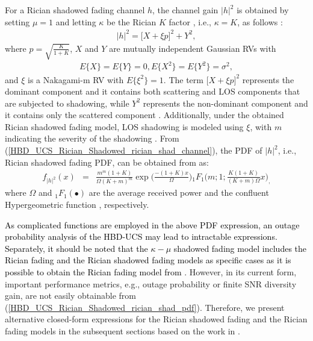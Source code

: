 For a Rician shadowed fading channel $h$, the channel gain $|h|^2$ is obtained by setting $\mu=1$ and letting $\kappa$ be the Rician $K$ factor \cite{chun2017comprehensive,paris2014statistical}, i.e., $\kappa = K$, as follows \cite[eq. (8)]{chun2017comprehensive}:
\begin{eqnarray} \label{HBD_UCS_Rician_Shadowed_rician_shad_channel}
|h|^2 = \big[X + {\xi}p\big]^2 + Y^2,
\end{eqnarray}
where $p = \sqrt{\frac{K}{1+K}}$, $X$ and $Y$ are mutually independent Gaussian RVs with
\begin{eqnarray}
E\{X\}=E\{Y\} = 0, E\{X^2\}=E\{Y^2\} = \sigma^2,
\end{eqnarray}
and $\xi$ is a Nakagami-m RV with $E\{\xi^2\}=1$. The term $\big[X + {\xi}p\big]^2$ represents the dominant component and it contains both scattering and LOS components that are subjected to shadowing, while $Y^2$ represents the non-dominant component and it contains only the scattered component \cite{yuan2018capacity}. Additionally, under the obtained Rician shadowed fading model, LOS shadowing is modeled using $\xi$, with $m$ indicating the severity of the shadowing \cite{chun2017comprehensive}. From (\ref{HBD_UCS_Rician_Shadowed_rician_shad_channel}), the PDF of $|h|^2$, i.e., Rician shadowed fading PDF, can be obtained from \cite[Table I]{chun2017comprehensive} as:
\begin{eqnarray} \label{HBD_UCS_Rician_Shadowed_rician_shad_pdf}
f_{|h|^2}(x) & = & \frac{m^m (1+K)}{\Omega(K+m)^m}\exp\Big(\frac{-(1+K)x}{\Omega}\Big) {}_1F_1\Big(m;1;\frac{K(1+K)}{(K+m)\Omega}x\Big)_,
\end{eqnarray}
where $\Omega$ and ${}_1{F_1}(\bullet)$ are the average received power and the confluent Hypergeometric function \cite{gradshteyn2014table}, respectively. 

\textcolor{black}{As complicated functions are employed in the above PDF expression, an outage probability analysis of the HBD-UCS may lead to intractable expressions. Separately, it should be noted that the $\kappa - \mu$ shadowed fading model includes the Rician fading and the Rician shadowed fading models as specific cases as it is possible to obtain the Rician fading model from \cite[Table I]{chun2017comprehensive}}. However, in its current form, important performance metrics, e.g., outage probability or finite SNR diversity gain, are not easily obtainable from (\ref{HBD_UCS_Rician_Shadowed_rician_shad_pdf}). Therefore, we present alternative closed-form expressions for the Rician shadowed fading and the Rician fading models in the subsequent sections based on the work in \cite{tan2018ricianShad}.

